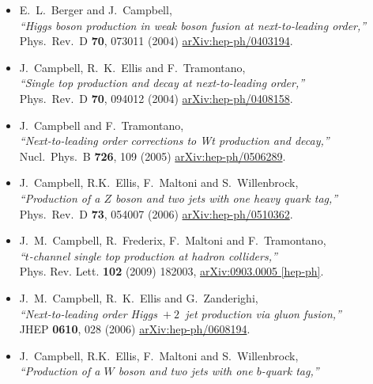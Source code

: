\begin{itemize}
%
\item E.~L.~Berger and J.~Campbell, \\
  {\it ``Higgs boson production in weak boson fusion at next-to-leading order,''} \\
  Phys.\ Rev.\ D {\bf 70}, 073011 (2004)
  \href{https://arxiv.org/abs/hep-ph/0403194}{arXiv:hep-ph/0403194}.
%
\item J.~Campbell, R.~K.~Ellis and F.~Tramontano, \\
  {\it ``Single top production and decay at next-to-leading order,''} \\
  Phys.\ Rev.\ D {\bf 70}, 094012 (2004)
  \href{https://arxiv.org/abs/hep-ph/0408158}{arXiv:hep-ph/0408158}.
%
\item J.~Campbell and F.~Tramontano, \\
  {\it ``Next-to-leading order corrections to Wt production and decay,''} \\
  Nucl.\ Phys.\ B {\bf 726}, 109 (2005)
  \href{https://arxiv.org/abs/hep-ph/0506289}{arXiv:hep-ph/0506289}.
%
\item   J.~Campbell, R.K.~Ellis, F.~Maltoni and S.~Willenbrock, \\
  {\it ``Production of a $Z$ boson and two jets with one heavy quark tag,''} \\
  Phys.\ Rev.\ D {\bf 73}, 054007 (2006)
  \href{https://arxiv.org/abs/hep-ph/0510362}{arXiv:hep-ph/0510362}.
%
\item J.~M.~Campbell, R.~Frederix, F.~Maltoni and F.~Tramontano,\\
  {\it ``$t$-channel single top production at hadron colliders,''} \\ 
  Phys. Rev. Lett. {\bf 102} (2009) 182003,
  \href{https://arxiv.org/abs/0903.0005}{arXiv:0903.0005 [hep-ph]}.
%
\item J.~M.~Campbell, R.~K.~Ellis and G.~Zanderighi, \\
  {\it ``Next-to-leading order Higgs~$+~2$~jet production via gluon fusion,''} \\
  JHEP {\bf 0610}, 028 (2006)
  \href{https://arxiv.org/abs/hep-ph/0608194}{arXiv:hep-ph/0608194}.
%
\item J.~Campbell, R.K.~Ellis, F.~Maltoni and S.~Willenbrock, \\
  {\it ``Production of a $W$ boson and two jets with one $b$-quark tag,''} \\

\end{itemize}
